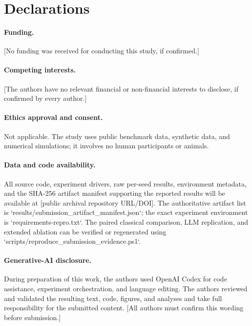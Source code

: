 \section*{Declarations}

\paragraph{Funding.}
[No funding was received for conducting this study, if confirmed.]

\paragraph{Competing interests.}
[The authors have no relevant financial or non-financial interests to disclose,
if confirmed by every author.]

\paragraph{Ethics approval and consent.}
Not applicable. The study uses public benchmark data, synthetic data, and
numerical simulations; it involves no human participants or animals.

\paragraph{Data and code availability.}
All source code, experiment drivers, raw per-seed results, environment metadata,
and the SHA-256 artifact manifest supporting the reported results will be
available at [public archival repository URL/DOI]. The authoritative artifact
list is `results/submission_artifact_manifest.json`; the exact experiment
environment is `requirements-repro.txt`. The paired classical comparison,
LLM replication, and extended ablation can be verified or regenerated using
`scripts/reproduce_submission_evidence.ps1`.

\paragraph{Generative-AI disclosure.}
During preparation of this work, the authors used OpenAI Codex for code
assistance, experiment orchestration, and language editing. The authors
reviewed and validated the resulting text, code, figures, and analyses and
take full responsibility for the submitted content. [All authors must confirm
this wording before submission.]
